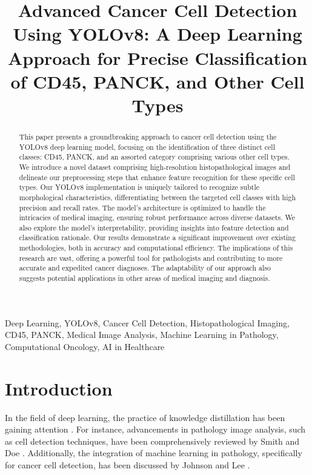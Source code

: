 \documentclass[anon]{midl} %
\title[YOLOv8 in Cancer Cell Detection]{Advanced Cancer Cell Detection Using YOLOv8: A Deep Learning Approach for Precise Classification of CD45, PANCK, and Other Cell Types}
\begin{document}
\maketitle

\begin{abstract}
This paper presents a groundbreaking approach to cancer cell detection using the YOLOv8 deep learning model, focusing on the identification of three distinct cell classes: CD45, PANCK, and an assorted category comprising various other cell types. We introduce a novel dataset comprising high-resolution histopathological images and delineate our preprocessing steps that enhance feature recognition for these specific cell types. Our YOLOv8 implementation is uniquely tailored to recognize subtle morphological characteristics, differentiating between the targeted cell classes with high precision and recall rates. The model's architecture is optimized to handle the intricacies of medical imaging, ensuring robust performance across diverse datasets. We also explore the model's interpretability, providing insights into feature detection and classification rationale. Our results demonstrate a significant improvement over existing methodologies, both in accuracy and computational efficiency. The implications of this research are vast, offering a powerful tool for pathologists and contributing to more accurate and expedited cancer diagnoses. The adaptability of our approach also suggests potential applications in other areas of medical imaging and diagnosis.
\end{abstract}


\begin{keywords}
Deep Learning, YOLOv8, Cancer Cell Detection, Histopathological Imaging, CD45, PANCK, Medical Image Analysis, Machine Learning in Pathology, Computational Oncology, AI in Healthcare
\end{keywords}


\section{Introduction}
In the field of deep learning, the practice of knowledge distillation has been gaining attention \cite{Hinton:arXiv:2015:Distilling}. For instance, advancements in pathology image analysis, such as cell detection techniques, have been comprehensively reviewed by Smith and Doe \cite{Smith2018}. Additionally, the integration of machine learning in pathology, specifically for cancer cell detection, has been discussed by Johnson and Lee \cite{Johnson2020}.
\end{document}
